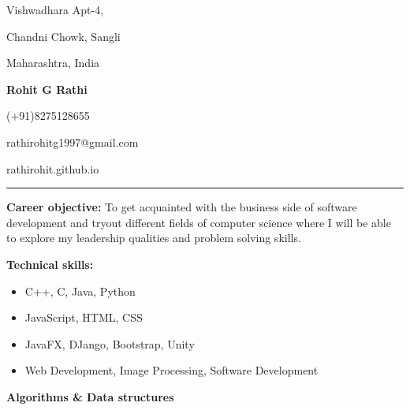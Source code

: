 \documentclass[a4paper,11pt]{article}
\begin{document}
	\begin{center}
		\begin{minipage}[b]{0.33333\textwidth}
			\raggedright
			Vishwadhara Apt-4,\par
			Chandni Chowk, Sangli\par
			Maharashtra, India
		\end{minipage}%
		\begin{minipage}[b]{0.33333\textwidth}
			\centering
			\begin{huge}
				\textbf{Rohit G Rathi}
			\end{huge}
		\end{minipage}%
		\begin{minipage}[b]{0.33333\textwidth}
			\raggedleft
			(+91)8275128655\par
			rathirohitg1997@gmail.com\par
			rathirohit.github.io\par
		\end{minipage}%
		\bigskip
		\hrule
		\vspace{0.5cm}
		\begin{minipage}[t]{1\textwidth}
			\raggedright\smallskip
			\begin{LARGE}
				\textbf{Career objective:}\medskip\linebreak%
				{\small To get acquainted with the business side of software development and tryout different fields of computer science where I will be able to explore my leadership qualities and problem solving skills.}\linebreak%
			\end{LARGE}
		\end{minipage}%
		\vspace{0.35cm}
		\begin{minipage}[t]{0.35\textwidth}
			\raggedright\smallskip
			\begin{LARGE}
				\textbf{Technical skills:}\medskip%
				{\small
					\begin{itemize}
						\item C++, C, Java, Python
						\item JavaScript, HTML, CSS
						\item JavaFX, DJango, Bootstrap, Unity
						\item Web Development, Image Processing, Software Development
					\end{itemize}
				}
				\small \textbf{Algorithms \& Data structures}
			\end{LARGE}
			\\\vspace{0.85cm}

\end{minipage}
\end{center}
\end{document}
